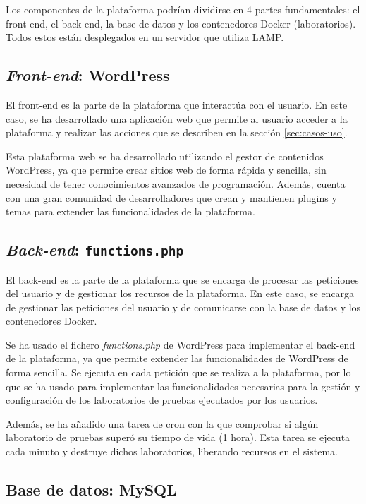         Los componentes de la plataforma podrían dividirse en 4 partes fundamentales: el front-end, el back-end, la base de datos y los contenedores Docker (laboratorios). Todos estos están desplegados en un servidor que utiliza LAMP.

        \subsection{\textit{Front-end}: WordPress}

            El front-end es la parte de la plataforma que interactúa con el usuario. En este caso, se ha desarrollado una aplicación web que permite al usuario acceder a la plataforma y realizar las acciones que se describen en la sección \ref{sec:casos-uso}.
            
            Esta plataforma web se ha desarrollado utilizando el gestor de contenidos WordPress, ya que permite crear sitios web de forma rápida y sencilla, sin necesidad de tener conocimientos avanzados de programación. Además, cuenta con una gran comunidad de desarrolladores que crean y mantienen plugins y temas para extender las funcionalidades de la plataforma.


        \subsection{\textit{Back-end}: \texttt{functions.php}}
        
            El back-end es la parte de la plataforma que se encarga de procesar las peticiones del usuario y de gestionar los recursos de la plataforma. En este caso, se encarga de gestionar las peticiones del usuario y de comunicarse con la base de datos y los contenedores Docker.
            
            Se ha usado el fichero \textit{functions.php} de WordPress para implementar el back-end de la plataforma, ya que permite extender las funcionalidades de WordPress de forma sencilla. Se ejecuta en cada petición que se realiza a la plataforma, por lo que se ha usado para implementar las funcionalidades necesarias para la gestión y configuración de los laboratorios de pruebas ejecutados por los usuarios.

            Además, se ha añadido una tarea de cron con la que comprobar si algún laboratorio de pruebas superó su tiempo de vida (1 hora). Esta tarea se ejecuta cada minuto y destruye dichos laboratorios, liberando recursos en el sistema.


        \subsection{Base de datos: MySQL}

